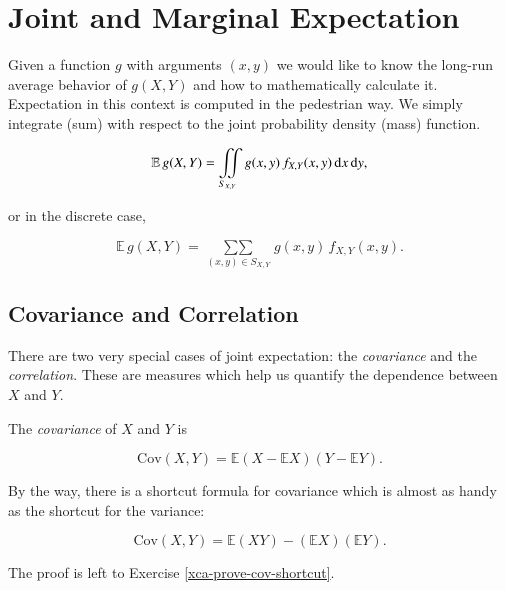 \documentclass[]{book}
\numberwithin{equation}{chapter}
\numberwithin{figure}{chapter}
\theoremstyle{plain}
\theoremstyle{definition}
\theoremstyle{remark}
\theoremstyle{definition}
\theoremstyle{definition}
\theoremstyle{remark}
\let\BeginKnitrBlock\begin \let\EndKnitrBlock\end
\begin{document}
\section{Joint and Marginal
Expectation}\label{sec-joint-and-marginal-expectation}

Given a function \(g\) with arguments \((x,y)\) we would like to know
the long-run average behavior of \(g(X,Y)\) and how to mathematically
calculate it. Expectation in this context is computed in the pedestrian
way. We simply integrate (sum) with respect to the joint probability
density (mass) function.

\begin{equation}
\mathbb{E}\, g(X,Y)=\iintop_{S_{X,Y}}g(x,y)\, f_{X,Y}(x,y)\,\mathrm{d} x\,\mathrm{d} y,
\end{equation}

or in the discrete case,

\begin{equation}
\mathbb{E}\, g(X,Y)=\mathop{\sum\sum}\limits _{(x,y)\in S_{X,Y}}g(x,y)\, f_{X,Y}(x,y).
\end{equation}

\subsection{Covariance and
Correlation}\label{covariance-and-correlation}

There are two very special cases of joint expectation: the
\emph{covariance} and the \emph{correlation}. These are measures which
help us quantify the dependence between \(X\) and \(Y\).

\bigskip

\BeginKnitrBlock{definition}
\protect\hypertarget{def:unnamed-chunk-302}{}{\label{def:unnamed-chunk-302}}The
\emph{covariance} of \(X\) and \(Y\) is

\begin{equation}
\mbox{Cov}(X,Y)=\mathbb{E}(X-\mathbb{E} X)(Y-\mathbb{E} Y).
\end{equation}
\EndKnitrBlock{definition}

By the way, there is a shortcut formula for covariance which is almost
as handy as the shortcut for the variance:

\begin{equation}
\mbox{Cov}(X,Y)=\mathbb{E}(XY)-(\mathbb{E} X)(\mathbb{E} Y).
\end{equation}

The proof is left to Exercise \ref{xca-prove-cov-shortcut}.
\end{document}
